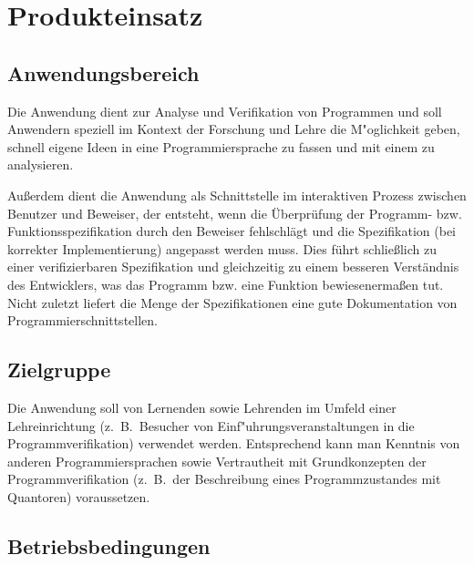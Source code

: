 \section{Produkteinsatz}%

\subsection{Anwendungsbereich}%

Die Anwendung dient zur Analyse und Verifikation von Programmen und soll Anwendern speziell im Kontext der Forschung und Lehre die M"oglichkeit geben, schnell eigene Ideen in eine Programmiersprache zu fassen und mit einem  zu analysieren.%

Außerdem dient die Anwendung als Schnittstelle im interaktiven Prozess zwischen Benutzer und Beweiser, der entsteht, wenn die Überprüfung der Programm- bzw. Funktionsspezifikation durch den Beweiser fehlschlägt und die Spezifikation (bei korrekter Implementierung) angepasst werden muss. Dies führt schließlich zu einer verifizierbaren Spezifikation und gleichzeitig zu einem besseren Verständnis des Entwicklers, was das Programm bzw. eine Funktion bewiesenermaßen tut. Nicht zuletzt liefert die Menge der Spezifikationen eine gute Dokumentation von Programmierschnittstellen.%

\subsection{Zielgruppe}%

Die Anwendung soll von Lernenden sowie Lehrenden im Umfeld einer Lehreinrichtung (z.~B.\ Besucher von Einf"uhrungsveranstaltungen in die Programmverifikation) verwendet werden. Entsprechend kann man Kenntnis von anderen Programmiersprachen sowie Vertrautheit mit Grundkonzepten der Programmverifikation (z.~B.\ der Beschreibung eines Programmzustandes mit Quantoren) voraussetzen.%

\subsection{Betriebsbedingungen}%

